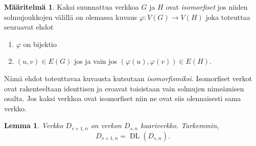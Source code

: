 \documentclass[finnish]{tktltiki2}
\newtheorem{lem}[lau]{Lemma}
\theoremstyle{definition}
\newtheorem{maar}[lau]{Määritelmä}
\theoremstyle{remark}
\newcommand{\from}{\colon}
\DeclareMathOperator{\DL}{DL}
\newcommand{\Dsn}{D_{s,n}}
\newcommand{\Dssn}{D_{s+1,n}}
\begin{document}
\begin{maar}
    Kaksi suunnattua verkkoa $G$ ja $H$ ovat \emph{isomorfiset} jos niiden
    solmujoukkojen välillä on olemassa kuvaus $\varphi \from V(G) \to V(H)$
    joka toteuttaa seuraavat ehdot
    \begin{enumerate}
        \item $\varphi$ on bijektio
        \item $(u,v) \in E(G)$ jos ja vain jos $(\varphi(u), \varphi(v)) \in
            E(H)$.
    \end{enumerate}
\end{maar}

Nämä ehdot toteuttavaa kuvausta kutsutaan \emph{isomorfismiksi}. Isomorfiset
verkot ovat rakenteeltaan identtisen ja eroavat toisistaan vain solmujen
nimeämisen osalta. Jos kaksi verkkoa ovat isomorfiset niin ne ovat siis
olennaisesti sama verkko.

\begin{lem}
    Verkko $\Dssn$ on verkon $\Dsn$ kaariverkko. Tarkemmin,
    \begin{equation*}
        \Dssn = \DL(\Dsn).
    \end{equation*}
\end{lem}
\end{document}
